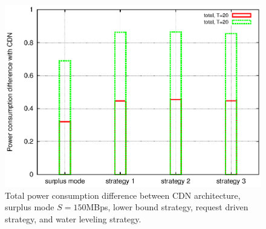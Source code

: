 \documentclass[conference]{IEEEtran}
\begin{document}
\begin{figure}[htp!]
\begin{minipage}[b]{0.3\linewidth}
	\includegraphics[scale=0.4]{graphs/diff-cdn.eps}
	\caption{Total power consumption difference between CDN architecture, surplus mode $S=150$MBps, lower bound strategy, request driven strategy, and water leveling strategy.}
	\label{fig:difftocdn}
\end{minipage}
\label{fig:diffstrategy}
\end{figure}
\end{document}
